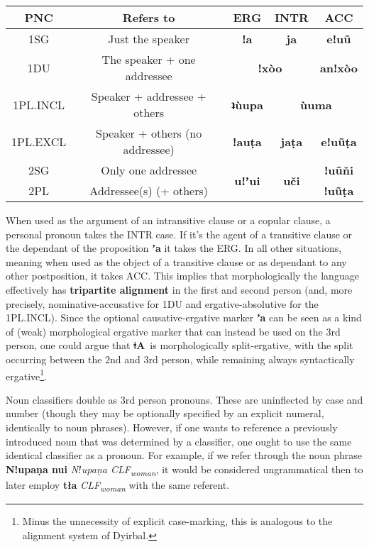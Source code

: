 \documentclass[11pt]{book}
\newcommand{\qcn}[1]{\textbf{#1}}
\newcommand{\langname}{\qcn{ǂA}~}
\newcommand{\transl}[2]{\qcn{#1} \emph{#2}}
\newcommand{\grammsc}[1]{\textsc{#1}}
\newcommand{\CLF}[1]{\grammsc{CLF}\textsubscript{#1}}
\newcommand{\ERG}{\grammsc{ERG}}
\newcommand{\ACC}{\grammsc{ACC}}
\newcommand{\INTR}{\grammsc{INTR}}
\begin{document}
\begin{center}
\begin{tabular}{|c|c|c|c|c|}
\hline
PNC & Refers to & \ERG & \INTR & \ACC \\ \hline \hline
1SG & Just the speaker &\qcn{ǃa} & \qcn{ja} & \qcn{eǃuũ}\\ \hline
1DU & The speaker + one addressee & \multicolumn{2}{c|}{\qcn{ǃxòo}} & \qcn{anǃxòo} \\ \hline
1PL.INCL & Speaker + addressee + others & \qcn{ʇùupa} & \multicolumn{2}{c|}{\qcn{ùuma}} \\ \hline
1PL.EXCL & Speaker + others (no addressee) &\qcn{ǃauṭa} & \qcn{jaṭa} & \qcn{eǃuũṭa}\\ \hline
2SG & Only one addressee &\multirow{2}{*}{\qcn{uǃʼui}} & \multirow{2}{*}{\qcn{uči}} & \qcn{ǃuũňi}\\ \cline{1-2} \cline{5-5}
2PL & Addressee(s) (+ others) &  &  & \qcn{ǃuũṭa}\\\hline
\end{tabular}
\end{center}

When used as the argument of an intransitive clause or a copular clause, a personal pronoun takes the \INTR{} case. If it's the agent of a transitive clause or the dependant of the proposition \qcn{ʼa} it takes the \ERG{}. In all other situations, meaning when used as the object of a transitive clause or as dependant to any other postposition, it takes \ACC{}. This implies that morphologically the language effectively has \textbf{tripartite alignment} in the first and second person (and, more precisely, nominative-accusative for 1DU and ergative-absolutive for the 1PL.INCL). Since the optional causative-ergative marker \qcn{ʼa} can be seen as a kind of (weak) morphological ergative marker that can instead be used on the 3rd person, one could argue that \langname is morphologically split-ergative, with the split occurring between the 2nd and 3rd person, while remaining always syntactically ergative\footnote{Minus the unnecessity of explicit case-marking, this is analogous to the alignment system of Dyirbal.}.

Noun classifiers double as 3rd person pronouns. These are uninflected by case and number (though they may be optionally specified by an explicit numeral, identically to noun phrases). However, if one wants to reference a previously introduced noun that was determined by a classifier, one ought to use the same identical classifier as a pronoun. For example, if we refer through the noun phrase \transl{Nǃupaṇa nui}{Nǃupaṇa \CLF{woman}}, it would be considered ungrammatical then to later employ \transl{tła}{\CLF{woman}} with the same referent.
\end{document}
